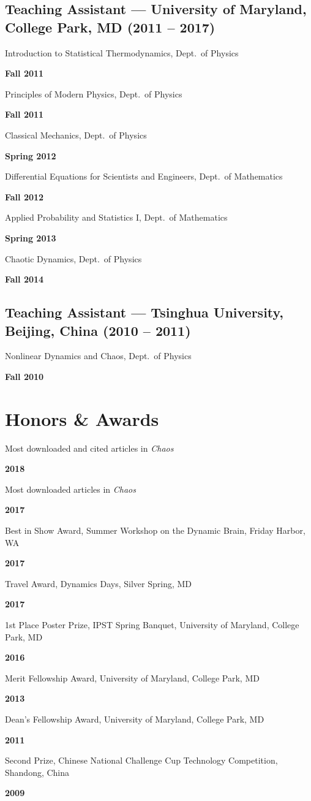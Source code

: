\documentclass[11pt]{article}
\newcommand{\entry}[2]{%
  \par\smallskip\noindent
  \begin{minipage}[t]{0.80\textwidth}\raggedright #1\end{minipage}\hfill
  \begin{minipage}[t]{0.18\textwidth}\raggedleft\textbf{#2}\end{minipage}\par}
\let\cvOriginalSection\section
\renewcommand{\section}{\Needspace{5\baselineskip}\cvOriginalSection}
\begin{document}
\subsection*{Teaching Assistant — University of Maryland, College Park, MD \textnormal{\small (2011 -- 2017)}}
\entry{Introduction to Statistical Thermodynamics, Dept.\ of Physics}{Fall 2011}
\entry{Principles of Modern Physics, Dept.\ of Physics}{Fall 2011}
\entry{Classical Mechanics, Dept.\ of Physics}{Spring 2012}
\entry{Differential Equations for Scientists and Engineers, Dept.\ of Mathematics}{Fall 2012}
\entry{Applied Probability and Statistics I, Dept.\ of Mathematics}{Spring 2013}
\entry{Chaotic Dynamics, Dept.\ of Physics}{Fall 2014}

\subsection*{Teaching Assistant — Tsinghua University, Beijing, China \textnormal{\small (2010 -- 2011)}}
\entry{Nonlinear Dynamics and Chaos, Dept.\ of Physics}{Fall 2010}

\section{Honors \& Awards}
\entry{Most downloaded and cited articles in \emph{Chaos}}{2018}
\entry{Most downloaded articles in \emph{Chaos}}{2017}
\entry{Best in Show Award, Summer Workshop on the Dynamic Brain, Friday Harbor, WA}{2017}
\entry{Travel Award, Dynamics Days, Silver Spring, MD}{2017}
\entry{1st Place Poster Prize, IPST Spring Banquet, University of Maryland, College Park, MD}{2016}
\entry{Merit Fellowship Award, University of Maryland, College Park, MD}{2013}
\entry{Dean's Fellowship Award, University of Maryland, College Park, MD}{2011}
\entry{Second Prize, Chinese National Challenge Cup Technology Competition, Shandong, China}{2009}

\end{document}
